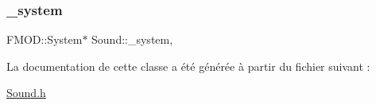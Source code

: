 \mbox{\label{classSound_aeeddfa10d6a7d247e566328a11903e06}} 
\subsubsection{\texorpdfstring{\+\_\+system}{\_system}}
{\footnotesize\ttfamily F\+M\+O\+D\+::\+System$\ast$ Sound\+::\+\_\+system\hspace{0.3cm}{\ttfamily [static]}, {\ttfamily [private]}}



La documentation de cette classe a été générée à partir du fichier suivant \+:\begin{DoxyCompactItemize}
\item 
\hyperlink{Sound_8h}{Sound.\+h}\end{DoxyCompactItemize}
